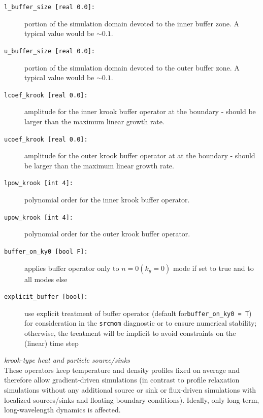 \documentclass[12pt]{article}
\begin{document}
\begin{description}
\item[\texttt{l\_buffer\_size [real 0.0]:}] portion of the simulation domain devoted to the inner buffer zone. A typical value would be $\sim 0.1$.
\item[\texttt{u\_buffer\_size [real 0.0]:}] portion of the simulation domain devoted to the outer buffer zone. A typical value would be $\sim 0.1$.
\item[\texttt{lcoef\_krook [real 0.0]:}] amplitude for the inner krook buffer operator at the boundary - should be larger than the maximum linear growth rate.
\item[\texttt{ucoef\_krook [real 0.0]:}] amplitude for the outer krook buffer operator at at the boundary - should be larger than the maximum linear growth rate.
\item[\texttt{lpow\_krook [int 4]:}] polynomial order for the inner krook buffer operator.
\item[\texttt{upow\_krook [int 4]:}] polynomial order for the outer krook buffer operator.
\item[\texttt{buffer\_on\_ky0 [bool F]:}] applies buffer operator only to $n=0 (k_y = 0)$ mode if set to true and to all modes else
\item[\texttt{explicit\_buffer [bool]:}] use explicit treatment of buffer operator (default for\texttt{buffer\_on\_ky0 = T}) for consideration in the {\tt srcmom}
diagnostic or to ensure numerical stability; otherwise, the treatment will be implicit to avoid constraints on the (linear) time step
\end{description}
%
{\em krook-type heat and particle source/sinks}\\[1ex]
These operators keep temperature and density profiles fixed on average and therefore allow gradient-driven simulations (in contrast to profile relaxation
simulations without any additional source or sink or flux-driven simulations with localized sources/sinks and floating boundary conditions). Ideally,
only long-term, long-wavelength dynamics is affected.
\end{document}
